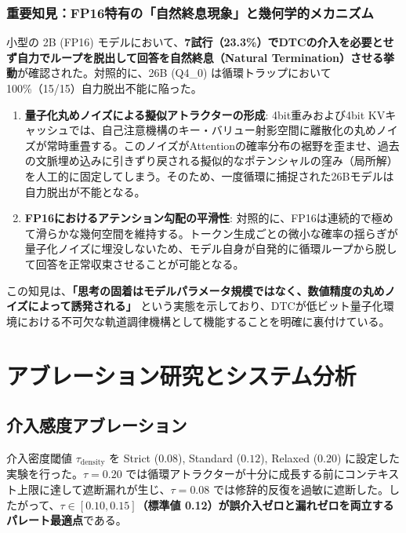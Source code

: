 \documentclass[11pt,a4paper]{article}
\begin{document}
\subsubsection{重要知見：FP16特有の「自然終息現象」と幾何学的メカニズム}
小型の 2B (FP16) モデルにおいて、\textbf{7試行（23.3\%）でDTCの介入を必要とせず自力でループを脱出して回答を自然終息（Natural Termination）させる挙動}が確認された。対照的に、26B (Q4\_0) は循環トラップにおいて 100\%（15/15）自力脱出不能に陥った。
\begin{enumerate}
    \item \textbf{量子化丸めノイズによる擬似アトラクターの形成}: 4bit重みおよび4bit KVキャッシュでは、自己注意機構のキー・バリュー射影空間に離散化の丸めノイズが常時重畳する。このノイズがAttentionの確率分布の裾野を歪ませ、過去の文脈埋め込みに引きずり戻される擬似的なポテンシャルの窪み（局所解）を人工的に固定してしまう。そのため、一度循環に捕捉された26Bモデルは自力脱出が不能となる。
    \item \textbf{FP16におけるアテンション勾配の平滑性}: 対照的に、FP16は連続的で極めて滑らかな幾何空間を維持する。トークン生成ごとの微小な確率の揺らぎが量子化ノイズに埋没しないため、モデル自身が自発的に循環ループから脱して回答を正常収束させることが可能となる。
\end{enumerate}
この知見は、\textbf{「思考の固着はモデルパラメータ規模ではなく、数値精度の丸めノイズによって誘発される」} という実態を示しており、DTCが低ビット量子化環境における不可欠な軌道調律機構として機能することを明確に裏付けている。

\section{アブレーション研究とシステム分析}

\subsection{介入感度アブレーション}
介入密度閾値 $\tau_{\mathrm{density}}$ を Strict ($0.08$), Standard ($0.12$), Relaxed ($0.20$) に設定した実験を行った。$\tau=0.20$ では循環アトラクターが十分に成長する前にコンテキスト上限に達して遮断漏れが生じ、$\tau=0.08$ では修辞的反復を過敏に遮断した。したがって、\textbf{$\tau \in [0.10, 0.15]$（標準値 0.12）が誤介入ゼロと漏れゼロを両立するパレート最適点}である。
\end{document}

